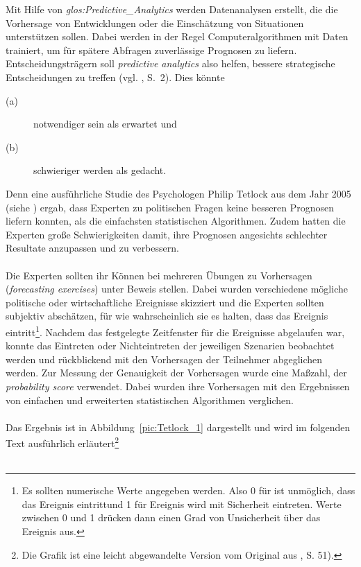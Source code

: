 Mit Hilfe von \emph{\gls{glos:Predictive_Analytics}} werden Datenanalysen
erstellt, die die Vorhersage von Entwicklungen oder die Einschätzung von
Situationen unterstützen sollen. Dabei werden in der Regel Computeralgorithmen
mit Daten trainiert, um für spätere Abfragen zuverlässige Prognosen zu liefern.
Entscheidungsträgern soll \emph{predictive analytics} also helfen, bessere
strategische Entscheidungen zu treffen (vgl. \cite{Mauerer}, S.~2). %
Dies könnte
\begin{description}
\item[(a)] notwendiger sein als erwartet und
\item[(b)] schwieriger werden als gedacht.
\end{description}
Denn eine ausführliche Studie des Psychologen Philip Tetlock aus dem Jahr 2005
(siehe \cite{Tetlock}) ergab,
dass Experten zu politischen Fragen keine besseren Prognosen liefern konnten,
als die einfachsten statistischen Algorithmen. Zudem hatten die Experten
große Schwierigkeiten damit, ihre Prognosen angesichts schlechter Resultate
anzupassen und zu verbessern. \\ \\
Die Experten sollten ihr Können bei mehreren Übungen zu Vorhersagen
(\emph{forecasting exercises}) unter Beweis stellen. Dabei wurden verschiedene
mögliche politische oder wirtschaftliche Ereignisse skizziert und die Experten
sollten subjektiv abschätzen, für wie wahrscheinlich sie es halten, dass das
Ereignis eintritt\footnote{Es sollten numerische Werte angegeben werden. Also
0 für  ist unmöglich, dass das Ereignis eintritt\grqq und 1 für
 Ereignis wird mit Sicherheit eintreten\grqq. Werte zwischen 0 und 1
drücken dann einen Grad von Unsicherheit über das Ereignis aus.}.
Nachdem das festgelegte Zeitfenster für die Ereignisse abgelaufen war, konnte
das Eintreten oder Nichteintreten der jeweiligen Szenarien beobachtet werden und
rückblickend mit den Vorhersagen der Teilnehmer abgeglichen werden.  
Zur Messung der Genauigkeit der Vorhersagen wurde eine Maßzahl,
der \emph{probability score} verwendet. Dabei wurden ihre Vorhersagen mit den
Ergebnissen von einfachen und erweiterten statistischen Algorithmen
verglichen. \\ \\
Das Ergebnis ist in Abbildung~\ref{pic:Tetlock_1} dargestellt und wird im
folgenden Text ausführlich erläutert\footnote{Die Grafik ist eine leicht 
abgewandelte Version vom Original aus \cite{Tetlock}, S. 51).} \\ \\
